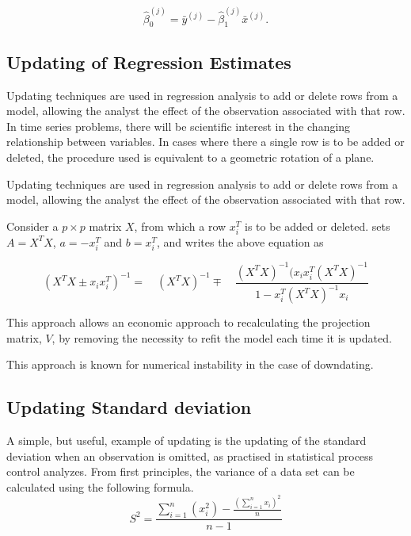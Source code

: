 \documentclass[12pt, a4paper]{report}
\theoremstyle{plain}
\theoremstyle{definition}
\theoremstyle{remark}
\begin{document}
	\begin{equation}
	\hat{\beta}_{0}^{(j)}=\bar{y}^{(j)}-\hat{\beta}_{1}^{(j)}\bar{x}^{(j)}.
	\end{equation}
	
	
	
	
	
	\subsection{Updating of Regression Estimates}
	Updating techniques are used in regression analysis to add or delete rows from a model, allowing the analyst the effect of the observation associated with that row. In time series problems, there will be scientific interest in the changing relationship between variables. In cases where there a single row is to be added or deleted, the procedure used is equivalent to a geometric rotation of a plane.
	
	Updating techniques are used in regression analysis to add or delete rows from a model, allowing the analyst the effect of the observation associated with that row.
	
	Consider a $p \times p$ matrix $X$, from which a row $x_{i}^{T}$ is to be added or deleted. \citet{CookWeisberg} sets $A = X^{T}X$,
	$a=-x_{i}^{T}$ and $b=x_{i}^{T}$, and writes the above equation as
	
	\begin{equation}
	(X^{T}X \pm x_{i}x_{i}^{T})^{-1} = \quad(X^{T}X )^{-1} \mp \quad
	\frac{(X^{T}X)^{-1}(x_{i}x_{i}^{T}(X^{T}X)^{-1}}{1-x_{i}^{T}(X^{T}X)^{-1}x_{i}}
	\end{equation}
	
	This approach allows an economic approach to recalculating the
	projection matrix, $V$, by removing the necessity to refit the
	model each time it is updated.
	
	This approach is known for numerical instability in the case of
	downdating.
	\subsection{Updating Standard deviation}
	A simple, but useful, example of updating is the updating of the standard deviation when an observation is omitted, as practised in statistical process control analyzes. From first principles, the variance of a data set can be calculated using the following formula.
	\begin{equation}
	S^{2}=\frac{\sum_{i=1}^{n}(x_{i}^{2})-\frac{(\sum_{i=1}^{n}x_{i})^{2}}{n}}{n-1}
	\end{equation}
	
\end{document}
